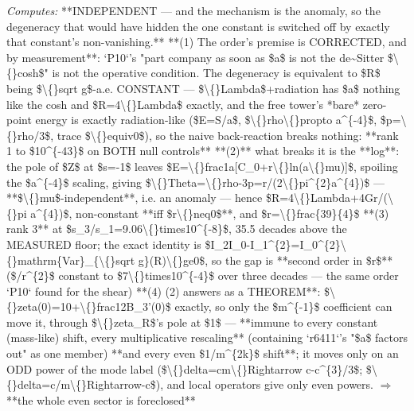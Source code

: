 \begin{description}
\emph{Computes:} **INDEPENDENT --- and the mechanism is the anomaly, so the degeneracy that would have hidden the one constant is switched off by exactly that constant's non-vanishing.**  **(1) The order's premise is CORRECTED, and by measurement**: `P10`'s "part company as soon as \$a\$ is not the de\textasciitilde{}Sitter \$\textbackslash\{\}cosh\$" is not the operative condition. The degeneracy is equivalent to \$R\$ being \$\textbackslash\{\}sqrt g\$-a.e. CONSTANT --- \$\textbackslash\{\}Lambda\$+radiation has \$a\$ nothing like the cosh and \$R=4\textbackslash\{\}Lambda\$ exactly, and the free tower's *bare* zero-point energy is exactly radiation-like (\$E=S/a\$, \$\textbackslash\{\}rho\textbackslash\{\}propto a\textasciicircum{}\{-4\}\$, \$p=\textbackslash\{\}rho/3\$, trace \$\textbackslash\{\}equiv0\$), so the naive back-reaction breaks nothing: **rank 1 to \$10\textasciicircum{}\{-43\}\$ on BOTH null controls**  **(2)** what breaks it is the **log**: the pole of \$Z\$ at \$s=-1\$ leaves \$E=\textbackslash\{\}frac1a[C\_0+r\textbackslash\{\}ln(a\textbackslash\{\}mu)]\$, spoiling the \$a\textasciicircum{}\{-4\}\$ scaling, giving \$\textbackslash\{\}Theta=\textbackslash\{\}rho-3p=r/(2\textbackslash\{\}pi\textasciicircum{}\{2\}a\textasciicircum{}\{4\})\$ --- **\$\textbackslash\{\}mu\$-independent**, i.e. an anomaly --- hence \$R=4\textbackslash\{\}Lambda+4Gr/(\textbackslash\{\}pi a\textasciicircum{}\{4\})\$, non-constant **iff \$r\textbackslash\{\}neq0\$**, and \$r=\textbackslash\{\}frac\{39\}\{4\}\$  **(3) rank 3** at \$s\_3/s\_1=9.06\textbackslash\{\}times10\textasciicircum{}\{-8\}\$, 35.5 decades above the MEASURED floor; the exact identity is \$I\_2I\_0-I\_1\textasciicircum{}\{2\}=I\_0\textasciicircum{}\{2\}\textbackslash\{\}mathrm\{Var\}\_\{\textbackslash\{\}sqrt g\}(R)\textbackslash\{\}ge0\$, so the gap is **second order in \$r\$** (\$/r\textasciicircum{}\{2\}\$ constant to \$7\textbackslash\{\}times10\textasciicircum{}\{-4\}\$ over three decades --- the same order `P10` found for the shear)  **(4) (2) answers as a THEOREM**: \$\textbackslash\{\}zeta(0)=10+\textbackslash\{\}frac12B\_3'(0)\$ exactly, so only the \$m\textasciicircum{}\{-1\}\$ coefficient can move it, through \$\textbackslash\{\}zeta\_R\$'s pole at \$1\$ --- **immune to every constant (mass-like) shift, every multiplicative rescaling** (containing `r6411`'s "\$a\$ factors out" as one member) **and every even \$1/m\textasciicircum{}\{2k\}\$ shift**; it moves only on an ODD power of the mode label (\$\textbackslash\{\}delta=cm\textbackslash\{\}Rightarrow c-c\textasciicircum{}\{3\}/3\$; \$\textbackslash\{\}delta=c/m\textbackslash\{\}Rightarrow-c\$), and local operators give only even powers. \ensuremath{\Rightarrow} **the whole even sector is foreclosed**

\end{description}

